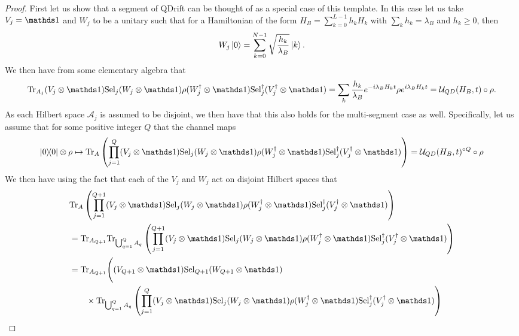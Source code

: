 \begin{proof}
First let us show that a segment of QDrift can be thought of as a special case of this template.  In this case let us take $V_j=\openone$ and $W_j$ to be a unitary such that for a Hamiltonian of the form $H_{B} = \sum_{k=0}^{L-1} h_k H_k$ with $\sum_k h_k = \lambda_B$ and $h_k\ge 0$, then
\begin{equation}
    W_j \ket{0} = \sum_{k=0}^{N-1} \sqrt{\frac{h_k}{\lambda_B}} \ket{k}.
\end{equation}
We then have from some elementary algebra that
\begin{equation}
    {\rm Tr}_{A_j}  (V_j\otimes \openone) {\rm Sel}_j (W_j\otimes \openone) \rho (W_j^\dagger\otimes \openone){\rm Sel}_j^\dagger (V_j^\dagger\otimes \openone) = \sum_{k} \frac{h_k}{\lambda_B} e^{-i \lambda_B H_k t} \rho e^{i \lambda_B H_k t} = \qdchan(H_B, t) \circ \rho.
\end{equation}
As each Hilbert space $\mathcal{A}_j$ is assumed to be disjoint, we then have that this also holds for the multi-segment case as well.  Specifically, let us assume that for some positive integer $Q$ that the channel maps
\begin{equation}
    \ketbra{0}{0}\otimes\rho \mapsto {\rm Tr}_{A} \left(\prod_{j=1}^{Q} (V_j\otimes \openone) {\rm Sel}_j (W_j\otimes \openone) \rho (W_j^\dagger\otimes \openone){\rm Sel}_j^\dagger (V_j^\dagger\otimes \openone)\right) = \qdchan(H_B, t)^{\circ Q} \circ \rho \label{eq:base}
\end{equation}
We then have using the fact that each of the $V_j$ and $W_j$ act on disjoint Hilbert spaces that
\begin{align}
    &{\rm Tr}_{A} \left(\prod_{j=1}^{Q+1} (V_j\otimes \openone) {\rm Sel}_j (W_j\otimes \openone) \rho (W_j^\dagger\otimes \openone){\rm Sel}_j^\dagger (V_j^\dagger\otimes \openone)\right) \nonumber\\
    &= {\rm Tr}_{A_{Q+1}} {\rm Tr}_{\bigcup_{q=1}^Q A_{q}} \left(\prod_{j=1}^{Q+1} (V_j\otimes \openone) {\rm Sel}_j (W_j\otimes \openone) \rho (W_j^\dagger\otimes \openone){\rm Sel}_j^\dagger (V_j^\dagger\otimes \openone)\right)\nonumber\\
    &= {\rm Tr}_{A_{Q+1}}  \Biggr((V_{Q+1}\otimes \openone) {\rm Sel}_{Q+1} (W_{Q+1}\otimes \openone)\nonumber\\
    &\qquad \times {\rm Tr}_{\bigcup_{q=1}^Q A_{q}}\left(\prod_{j=1}^{Q} (V_j\otimes \openone) {\rm Sel}_j (W_j\otimes \openone) \rho (W_j^\dagger\otimes \openone){\rm Sel}_j^\dagger (V_j^\dagger\otimes \openone)\right)\nonumber\\

\end{align}
\end{proof}
